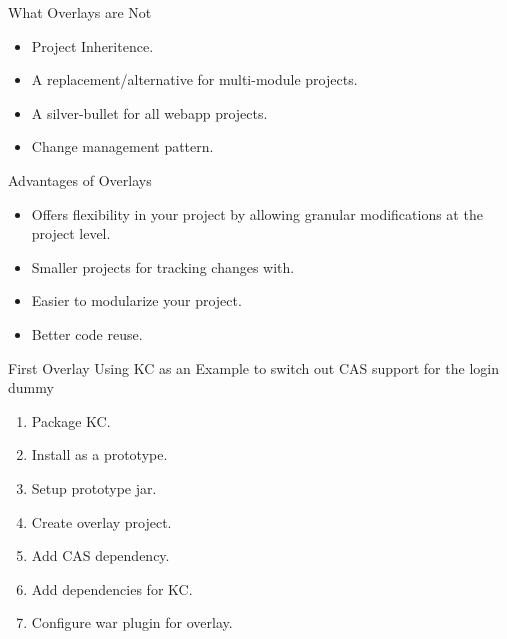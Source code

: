 \documentclass[xcolor=dvipsnames,14pt,professionalfonts]{beamer}
\begin{document}
\begin{frame}{What Overlays are Not}
  \begin{itemize}
  \item Project Inheritence.
  \item A replacement/alternative for multi-module projects.
  \item A silver-bullet for all webapp projects.
  \item Change management pattern.
  \end{itemize}
\end{frame}


\begin{frame}{Advantages of Overlays}
  \begin{itemize}
    \item Offers flexibility in your project by allowing granular
      modifications at the project level.
    \item Smaller projects for tracking changes with.
    \item Easier to modularize your project.
    \item Better code reuse.
  \end{itemize}
\end{frame}

\begin{frame}{First Overlay}
  Using KC as an Example to switch out CAS support for the login dummy
  \begin{enumerate}
    \item Package KC.
    \item Install as a prototype.
    \item Setup prototype jar.
    \item Create overlay project.
    \item Add CAS dependency.
    \item Add dependencies for KC.
    \item Configure war plugin for overlay.
  \end{enumerate}
\end{frame}
\end{document}
